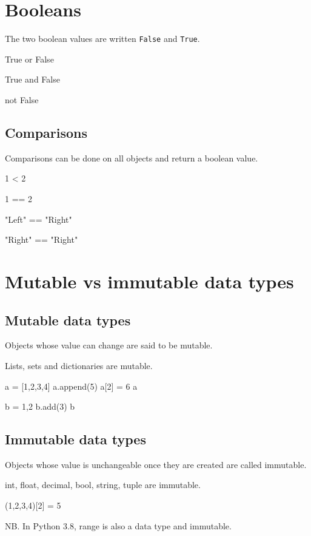 \documentclass[aspectratio=1610,slidestop]{beamer}
\begin{document}
\section{Booleans}
\begin{pframe}
The two boolean values are written \texttt{False} and
\texttt{True}.
\begin{pyconsole}
True or False

True and False

not False
\end{pyconsole}
\end{pframe}


\subsection{Comparisons}
\begin{pframe}
  Comparisons can be done on all objects and return a boolean value.
\begin{pyconsole}
1 < 2

1 == 2

"Left" == "Right"

"Right" == "Right"
\end{pyconsole}
\end{pframe}


\section{Mutable vs immutable data types}
\subsection{Mutable data types}
\begin{pframe}
Objects whose value can change are said to be mutable. 

Lists, sets and dictionaries are mutable.
\begin{pyconsole}
a = [1,2,3,4]
a.append(5)
a[2] = 6
a

b = {1,2}
b.add(3)
b
\end{pyconsole}
\end{pframe}

\subsection{Immutable data types}
\begin{pframe}
Objects whose value is unchangeable once they are created are called immutable.

int, float, decimal, bool, string, tuple are immutable.
\begin{pyconsole}
(1,2,3,4)[2] = 5
\end{pyconsole}
\medskip
\medskip
NB. In Python 3.8, range is also a data type and immutable.
\end{pframe}
\end{document}
